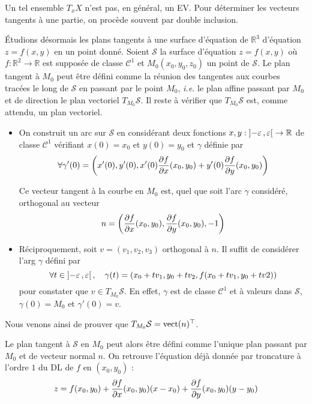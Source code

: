     Un tel ensemble $T_x X$ n’est pas, en général, un EV. Pour déterminer les vecteurs tangents à une partie, on procède souvent par double inclusion.

    Étudions désormais les plans tangents à une surface d’équation de $\mathbb{R}^3$ d’équation $z = f(x,y)$ en un point donné. Soient $\mathcal{S}$ la surface d’équation $z = f(x,y)$ où $f: \mathbb{R}^2 \to \mathbb{R}$ est supposée de classe $\mathcal{C}^1$ et $M_0(x_0,y_0,z_0)$ un point de $\mathcal{S}$. Le plan tangent à $M_0$ peut être défini comme la réunion des tangentes aux courbes tracées le long de $\mathcal{S}$ en passant par le point $M_0$, \textit{i.e.} le plan affine passant par $M_0$ et de direction le plan vectoriel $T_{M_0}\mathcal{S}$. Il reste à vérifier que $T_{M_0}\mathcal{S}$ est, comme attendu, un plan vectoriel.

    \begin{itemize}
        \item On construit un arc sur $\mathcal{S}$ en considérant deux fonctions $x,y : \left] -\varepsilon \, , \varepsilon \right[ \to \mathbb{R}$ de classe $\mathcal{C}^1$ vérifiant $x(0) = x_0$ et $y(0) = y_0$ et $\gamma$ définie par 
        \[ \forall \gamma'(0) = \left(x'(0), y'(0), x'(0) \frac{\partial f}{\partial x}(x_0,y_0) + y'(0) \frac{\partial f}{\partial y}(x_0,y_0)\right) \]
        
        Ce vecteur tangent à la courbe en $M_0$ est, quel que soit l’arc $\gamma$ considéré, orthogonal au vecteur 
        \[ n = \left(\frac{\partial f}{\partial x}(x_0,y_0),\frac{\partial f}{\partial y}(x_0,y_0), -1\right) \]   
        \item Réciproquement, soit $v = (v_1,v_2,v_3)$ orthogonal à $n$. Il suffit de considérer l’arg $\gamma$ défini par 
        \[ \forall t \in \left] -\varepsilon \, , \varepsilon \right[, \quad \gamma(t) = (x_0 + tv_1, y_0 + tv_2, f(x_0+tv_1, y_0 + tv2)) \]   
        pour constater que $v \in T_{M_0} \mathcal{S}$. En effet, $\gamma$ est de classe $\mathcal{C}^1$ et à valeurs dans $\mathcal{S}$, $\gamma(0) = M_0$ et $\gamma'(0) = v$. 
    \end{itemize} 
    Nous venons ainsi de prouver que $T_{M_0}\mathcal{S} = \operatorname{vect}(n)^{\top}$.

    Le plan tangent à $\mathcal{S}$ en $M_0$ peut alors être défini comme l’unique plan passant par $M_0$ et de vecteur normal $n$. On retrouve l’équation déjà donnée par troncature à l’ordre $1$ du DL de $f$ en $(x_0,y_0)$ : 
    \[ z = f(x_0,y_0) + \frac{\partial f}{\partial x}(x_0,y_0)(x - x_0) + \frac{\partial f}{\partial y}(x_0,y_0)(y - y_0) \]    

